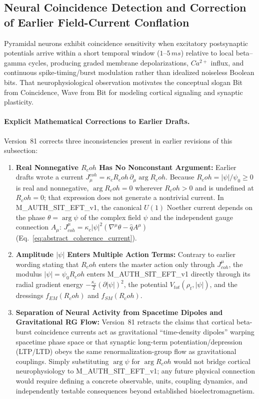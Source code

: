 \documentclass[american,11pt,letterpaper]{article}
\newcommand{\Rcoh}{R_{\mathrm{coh}}}
\def\mathrm#1{#1}%
\def\texttt#1{#1}%
\def\emph#1{#1}%
\def\Rcoh{R_coh}%
\begin{document}
\subsection{Neural Coincidence Detection and Correction of Earlier Field-Current Conflation}
\label{sec:neural_coherence}

Pyramidal neurons exhibit coincidence sensitivity when excitatory postsynaptic potentials arrive within a short temporal window ($1\text{--}5\,\mathrm{ms}$) relative to local beta--gamma cycles, producing graded membrane depolarizations, $\mathrm{Ca}^{2+}$ influx, and continuous spike-timing/burst modulation rather than idealized noiseless Boolean bits. That neurophysiological observation motivates the conceptual slogan \emph{Bit from Coincidence, Wave from Bit} for modeling cortical signaling and synaptic plasticity.

\paragraph{Explicit Mathematical Corrections to Earlier Drafts.}
Version~81 corrects three inconsistencies present in earlier revisions of this subsection:
\begin{enumerate}[leftmargin=2em]
  \item \textbf{Real Nonnegative $\Rcoh$ Has No Nonconstant Argument:} Earlier drafts wrote a current $J_\mu^{\mathrm{coh}} = \kappa_c \Rcoh\,\partial_\mu\arg\Rcoh$. Because $\Rcoh = |\psi|/\psi_0 \ge 0$ is real and nonnegative, $\arg\Rcoh = 0$ wherever $\Rcoh > 0$ and is undefined at $\Rcoh = 0$; that expression does not generate a nontrivial current. In \texttt{M\_AUTH\_SIT\_EFT\_v1}, the canonical $U(1)$ Noether current depends on the phase $\theta = \arg\psi$ of the complex field $\psi$ and the independent gauge connection $A_\mu$: $J^\mu_{\mathrm{coh}} = \kappa_c|\psi|^2(\nabla^\mu\theta - \hat{q}A^\mu)$ (Eq.~\eqref{eq:abstract_coherence_current}).
  \item \textbf{Amplitude $|\psi|$ Enters Multiple Action Terms:} Contrary to earlier wording stating that $\Rcoh$ enters the master action only through $J^\mu_{\mathrm{coh}}$, the modulus $|\psi| = \psi_0\Rcoh$ enters \texttt{M\_AUTH\_SIT\_EFT\_v1} directly through its radial gradient energy $-\frac{\kappa_c}{2}(\partial|\psi|)^2$, the potential $V_{\mathrm{tot}}(\rho_t, |\psi|)$, and the dressings $f_{\mathrm{EM}}(\Rcoh)$ and $f_{\mathrm{SM}}(\Rcoh)$.
  \item \textbf{Separation of Neural Activity from Spacetime Dipoles and Gravitational RG Flow:} Version~81 retracts the claims that cortical beta-burst coincidence currents act as gravitational ``time-density dipoles'' warping spacetime phase space or that synaptic long-term potentiation/depression (LTP/LTD) obeys the same renormalization-group flow as gravitational couplings. Simply substituting $\arg\psi$ for $\arg\Rcoh$ would not bridge cortical neurophysiology to \texttt{M\_AUTH\_SIT\_EFT\_v1}; any future physical connection would require defining a concrete observable, units, coupling dynamics, and independently testable consequences beyond established bioelectromagnetism.
\end{enumerate}
\end{document}
